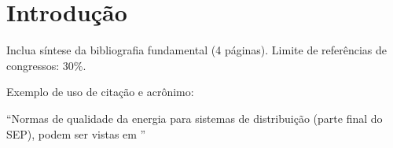 \section{Introdução}
\label{Introdução}

Inclua síntese da bibliografia fundamental (4 páginas).  Limite de referências de congressos: $30\%$.

Exemplo de uso de citação e acrônimo:

``Normas de qualidade da energia para sistemas de distribuição (parte final do \ac{SEP}), podem ser vistas em \cite{prodist8}''





